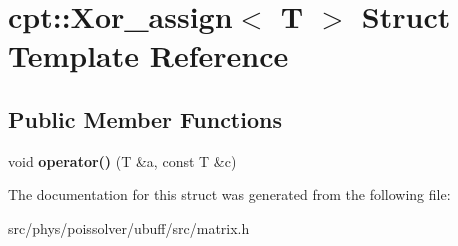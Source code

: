 \hypertarget{structcpt_1_1Xor__assign}{}\section{cpt\+:\+:Xor\+\_\+assign$<$ T $>$ Struct Template Reference}
\label{structcpt_1_1Xor__assign}
\subsection*{Public Member Functions}
\begin{DoxyCompactItemize}
\item 
void {\bfseries operator()} (T \&a, const T \&c)\hypertarget{structcpt_1_1Xor__assign_a2d04e03fc8eeeb43ab214de95d844721}{}\label{structcpt_1_1Xor__assign_a2d04e03fc8eeeb43ab214de95d844721}

\end{DoxyCompactItemize}


The documentation for this struct was generated from the following file\+:\begin{DoxyCompactItemize}
\item 
src/phys/poissolver/ubuff/src/matrix.\+h\end{DoxyCompactItemize}
